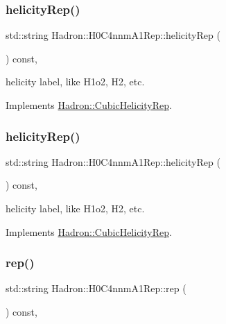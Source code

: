 \subsubsection{\texorpdfstring{helicityRep()}{helicityRep()}\hspace{0.1cm}{\footnotesize\ttfamily [2/3]}}
{\footnotesize\ttfamily std\+::string Hadron\+::\+H0\+C4nnm\+A1\+Rep\+::helicity\+Rep (\begin{DoxyParamCaption}{ }\end{DoxyParamCaption}) const\hspace{0.3cm}{\ttfamily [inline]}, {\ttfamily [virtual]}}

helicity label, like H1o2, H2, etc. 

Implements \mbox{\hyperlink{structHadron_1_1CubicHelicityRep_af1096946b7470edf0a55451cc662f231}{Hadron\+::\+Cubic\+Helicity\+Rep}}.

\mbox{\label{structHadron_1_1H0C4nnmA1Rep_aac6980c132c730c917ea06f915c2cd21}} 
\subsubsection{\texorpdfstring{helicityRep()}{helicityRep()}\hspace{0.1cm}{\footnotesize\ttfamily [3/3]}}
{\footnotesize\ttfamily std\+::string Hadron\+::\+H0\+C4nnm\+A1\+Rep\+::helicity\+Rep (\begin{DoxyParamCaption}{ }\end{DoxyParamCaption}) const\hspace{0.3cm}{\ttfamily [inline]}, {\ttfamily [virtual]}}

helicity label, like H1o2, H2, etc. 

Implements \mbox{\hyperlink{structHadron_1_1CubicHelicityRep_af1096946b7470edf0a55451cc662f231}{Hadron\+::\+Cubic\+Helicity\+Rep}}.

\mbox{\label{structHadron_1_1H0C4nnmA1Rep_a99c77d4cddc66d00c5fbeb5e4927dfba}} 
\subsubsection{\texorpdfstring{rep()}{rep()}\hspace{0.1cm}{\footnotesize\ttfamily [1/5]}}
{\footnotesize\ttfamily std\+::string Hadron\+::\+H0\+C4nnm\+A1\+Rep\+::rep (\begin{DoxyParamCaption}{ }\end{DoxyParamCaption}) const\hspace{0.3cm}{\ttfamily [inline]}, {\ttfamily [virtual]}}



